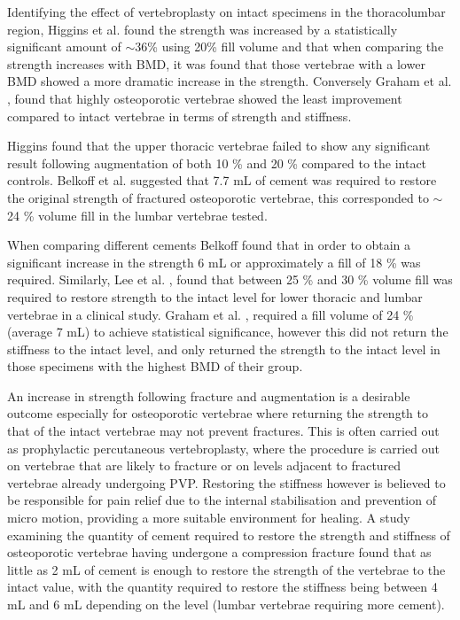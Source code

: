 Identifying the effect of vertebroplasty on intact specimens in the
thoracolumbar region, Higgins et al. \cite{Higgins2007a} found the strength was
increased by a statistically significant amount of $\sim$36\% using 20\% fill volume
and that when comparing the strength increases with BMD, it was found
that those vertebrae with a lower BMD showed a more dramatic increase in
the strength. Conversely Graham et al. \cite{Graham2003}, found that highly osteoporotic
vertebrae showed the least improvement compared to intact vertebrae in
terms of strength and stiffness. 

Higgins found that the upper thoracic
vertebrae failed to show any significant result following augmentation
of both 10 \% and 20 \% compared to the intact controls. Belkoff et al.
\cite{belkoff2000vertebroplasty} suggested that 7.7 mL of cement was required
to restore the
original strength of fractured osteoporotic vertebrae, this corresponded
to $\sim$24 \% volume fill in the lumbar vertebrae tested. 

When comparing different cements Belkoff
\cite{belkoff2000biomechanical} found that in order to obtain a significant
increase in the
strength 6 mL or approximately a fill of 18 \% was required. Similarly,
Lee et al. \cite{lee2002prediction}, found that between 25 \% and 30 \% volume
fill was
required to restore strength to the intact level for lower thoracic and
lumbar vertebrae in a clinical study. Graham et al. \cite{Graham2003}, required a fill
volume of 24 \% (average 7 mL) to achieve statistical significance,
however this did not return the stiffness to the intact level, and only
returned the strength to the intact level in those specimens with the
highest BMD of their group.

An increase in strength following fracture and augmentation is a
desirable outcome especially for osteoporotic vertebrae where
returning the strength to that of the intact vertebrae may not prevent
fractures. This is often carried out as prophylactic percutaneous vertebroplasty, where the procedure is carried out on vertebrae that are likely to fracture or on levels adjacent to fractured vertebrae already undergoing PVP. Restoring the stiffness however is believed to be responsible
for pain relief due to the internal stabilisation and prevention of
micro motion, providing a more suitable environment for healing. A study
examining the quantity of cement required to restore the strength and
stiffness of osteoporotic vertebrae having undergone a compression
fracture found that as little as 2 mL of cement is enough to restore the
strength of the vertebrae to the intact value, with the quantity
required to restore the stiffness being between 4 mL and 6 mL depending
on the level (lumbar vertebrae requiring more
cement)\cite{belkoff2001biomechanics}.

